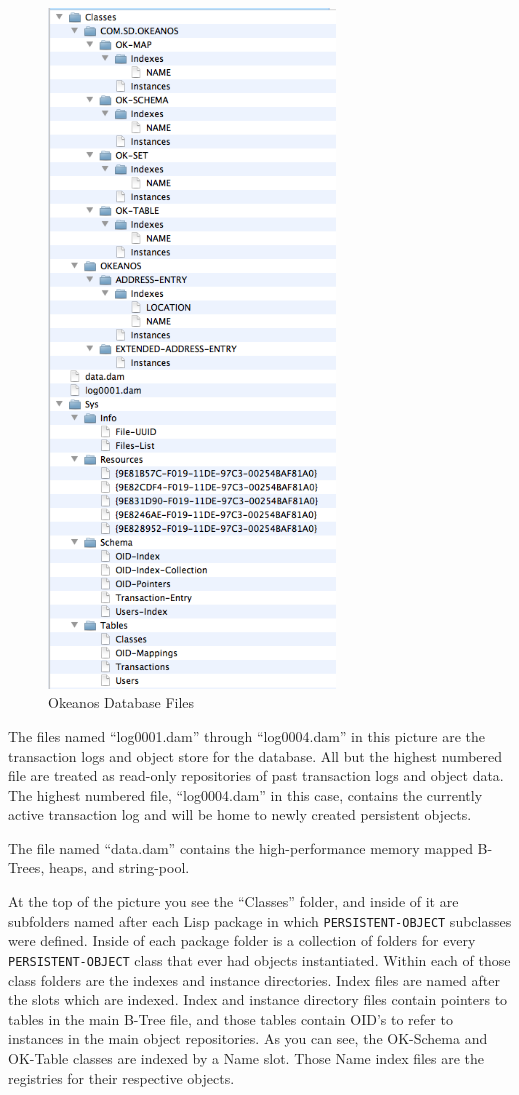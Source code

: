 \documentclass[article,oneside]{memoir}
\begin{document}
\begin{figure}[htbp]
  \centering
  \includegraphics[width=3in]{OkeanosDatabaseFiles.png}
  \caption{Okeanos Database Files}
  \label{fig:OkeanosDatabaseFiles}
\end{figure}

The files named ``log0001.dam'' through ``log0004.dam'' in this picture are the transaction logs and object store for the database. All but the highest numbered file are treated as read-only repositories of past transaction logs and object data. The highest numbered file, ``log0004.dam'' in this case, contains the currently active transaction log and will be home to newly created persistent objects.

The file named ``data.dam'' contains the high-performance memory mapped B-Trees, heaps, and string-pool.

At the top of the picture you see the ``Classes'' folder, and inside of it are subfolders named after each Lisp package in which \texttt{PERSISTENT-OBJECT} subclasses were defined. Inside of each package folder is a collection of folders for every \texttt{PERSISTENT-OBJECT} class that ever had objects instantiated.  Within each of those class folders are the indexes and instance directories. Index files are named after the slots which are indexed. Index and instance directory files contain pointers to tables in the main B-Tree file, and those tables contain OID's to refer to instances in the main object repositories. As you can see, the OK-Schema and OK-Table classes are indexed by a Name slot. Those Name index files are the registries for their respective objects.
\end{document}
